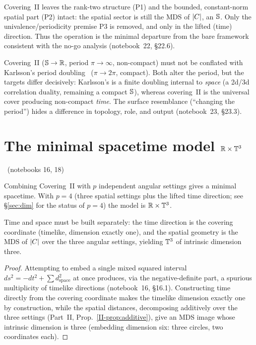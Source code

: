 \documentclass[11pt]{article}
\begin{document}
\begin{remark}\label{rem:p3}
Covering~II leaves the rank-two structure (P1) and the bounded, constant-norm spatial
part (P2) intact: the spatial sector is still the MDS of $|C|$, an $\mathbb{S}$. Only the
univalence/periodicity premise P3 is removed, and only in the lifted (time) direction.
Thus the operation is the minimal departure from the bare framework consistent with the
no-go analysis (notebook~22, \S22.6).
\end{remark}

\begin{remark}\label{rem:karlsson}
Covering~II ($\mathbb{S}\to\mathbb{R}$, period $\pi\to\infty$, non-compact) must not be conflated
with Karlsson's period doubling~\cite{karlsson} ($\pi\to2\pi$, compact). Both alter the
period, but the targets differ decisively: Karlsson's is a finite doubling internal to
\emph{space} (a 2d/3d correlation duality, remaining a compact $\mathbb{S}$), whereas
covering~II is the universal cover producing non-compact \emph{time}. The surface
resemblance (``changing the period'') hides a difference in topology, role, and
output (notebook~23, \S23.3).
\end{remark}

\section{The minimal spacetime model $\mathbb{R}\times\mathbb{T}^{3}$}\label{sec:rxt3}
\established\ (notebooks 16, 18)

Combining Covering~II with $p$ independent angular settings gives a minimal spacetime.
With $p=4$ (three spatial settings plus the lifted time direction; see \S\ref{sec:dim} for
the status of $p=4$) the model is $\mathbb{R}\times\mathbb{T}^{3}$.

\begin{proposition}\label{prop:sep}
Time and space must be built separately: the time direction is the covering coordinate
(timelike, dimension exactly one), and the spatial geometry is the MDS of $|C|$ over
the three angular settings, yielding $\mathbb{T}^{3}$ of intrinsic dimension three.
\end{proposition}

\begin{proof}
Attempting to embed a single mixed squared interval
$ds^2=-dt^2+\sum d_{\text{space}}^2$ at once produces, via the negative-definite part, a
spurious multiplicity of timelike directions (notebook~16, \S16.1). Constructing time
directly from the covering coordinate makes the timelike dimension exactly one by
construction, while the spatial distances, decomposing additively over the three settings
(Part~II, Prop.~\ref{II-prop:additive}), give an MDS image whose intrinsic dimension is three
(embedding dimension six: three circles, two coordinates each).
\end{proof}
\end{document}
